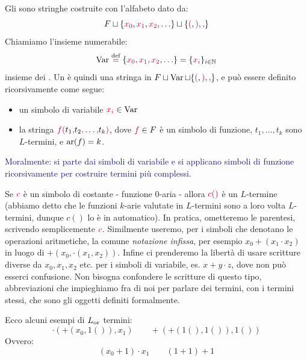 \begin{definition}
    [$L$-termine]
    Gli  sono stringhe costruite con l'alfabeto dato da:
    \[ F \sqcup \{\textcolor{purple}{x_0},\textcolor{purple}{x_1},\textcolor{purple}{x_2}, \ldots\} \sqcup \{\textcolor{purple}{(}, \textcolor{purple}{)}, \textcolor{purple}{,}\}
    \]
    Chiamiamo l'insieme numerabile:
    \[ \operatorname{Var}\overset{\text{def}}{=} \{\textcolor{purple}{x_0},\textcolor{purple}{x_1},\textcolor{purple}{x_2}, \ldots\} = \{\textcolor{purple}{x_i}\}_{i \in \mathbb N}
    \]
    insieme dei . Un  è quindi una stringa in $F \sqcup \operatorname{Var}\sqcup \{\textcolor{purple}{(}, \textcolor{purple}{)}, \textcolor{purple}{,}\}$, e può essere definito ricorsivamente come segue:
    \begin{itemize}
        \item un simbolo di variabile $\textcolor{purple}{x_i} \in \operatorname{Var}$
        \item la stringa $\textcolor{purple}{f(}t_1\textcolor{purple}{,}t_2\textcolor{purple}{,} \ldots\textcolor{purple}{,} t_k\textcolor{purple}{)}$, dove $\textcolor{purple}{f} \in F$ è un simbolo di funzione, $t_1,\ldots,t_k$ sono $L$-termini, e $\operatorname{ar}(f) = k$.
    \end{itemize}
\end{definition}

\textcolor{MidnightBlue}{Moralmente: si parte dai simboli di variabile e si applicano simboli di funzione ricorsivamente per costruire termini più complessi.}

\begin{remark}
    Se $\textcolor{purple}{c}$ è un simbolo di costante - funzione 0-aria - allora $\textcolor{purple}{c()}$ è un $L$-termine (abbiamo detto che le funzioni $k$-arie valutate in $L$-termini sono a loro volta $L$-termini, dunque $c()$ lo è in automatico).
    In pratica, ometteremo le parentesi, scrivendo semplicemente $\textcolor{purple}{c}$.
    Similmente useremo, per i simboli che denotano le operazioni aritmetiche, la comune \emph{notazione infissa}, per esempio $x_0 + (x_1 \cdot x_2)$ in luogo di $+(x_0, \cdot(x_1,x_2))$.
    Infine ci prenderemo la libertà di usare scritture diverse da $x_0,x_1,x_2$ etc. per i simboli di variabile, es. $x+y\cdot z$, dove non può esserci confusione.
    Non bisogna confondere le scritture di questo tipo, abbreviazioni che impieghiamo fra di noi per parlare dei termini, con i termini stessi, che sono gli oggetti definiti formalmente.
\end{remark}

\begin{example}[$L$-termini]
    Ecco alcuni esempi di $L_{\text{\text{or}}}$ termini:
    \[ \cdot(+(x_0,1()),x_1) \qquad +(+(1(),1()),1())
    \]
    Ovvero:
    \[ (x_0 + 1) \cdot x_1 \qquad (1 + 1) + 1
    \]
\end{example}

